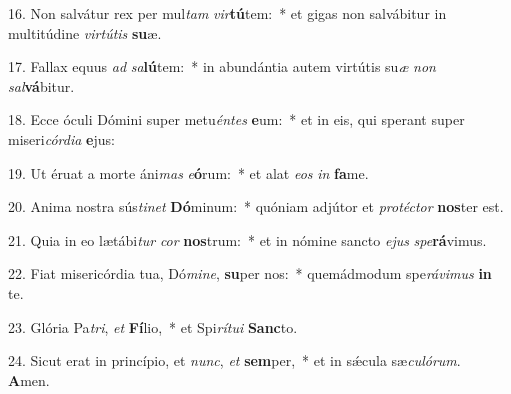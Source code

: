 16. Non salvátur rex per mul\textit{tam} \textit{vir}\textbf{tú}tem:~*  et gigas non salvábitur in multitúdine \textit{vir}\textit{tú}\textit{tis} \textbf{su}æ.\

17. Fallax equus \textit{ad} \textit{sa}\textbf{lú}tem:~*  in abundántia autem virtútis su\textit{æ} \textit{non} \textit{sal}\textbf{vá}bitur.\

18. Ecce óculi Dómini super metu\textit{én}\textit{tes} \textbf{e}um:~*  et in eis, qui sperant super miseri\textit{cór}\textit{di}\textit{a} \textbf{e}jus:\

19. Ut éruat a morte áni\textit{mas} \textit{e}\textbf{ó}rum:~*  et alat \textit{e}\textit{os} \textit{in} \textbf{fa}me.\

20. Anima nostra sús\textit{ti}\textit{net} \textbf{Dó}minum:~*  quóniam adjútor et \textit{pro}\textit{téc}\textit{tor} \textbf{nos}ter est.\

21. Quia in eo lætábi\textit{tur} \textit{cor} \textbf{nos}trum:~*  et in nómine sancto \textit{e}\textit{jus} \textit{spe}\textbf{rá}vimus.\

22. Fiat misericórdia tua, Dó\textit{mi}\textit{ne}, \textbf{su}per nos:~*  quemádmodum spe\textit{rá}\textit{vi}\textit{mus} \textbf{in} te.\

23. Glória Pa\textit{tri}, \textit{et} \textbf{Fí}lio,~*  et Spi\textit{rí}\textit{tu}\textit{i} \textbf{Sanc}to.\

24. Sicut erat in princípio, et \textit{nunc}, \textit{et} \textbf{sem}per,~*  et in sǽcula sæ\textit{cu}\textit{ló}\textit{rum}. \textbf{A}men.\

